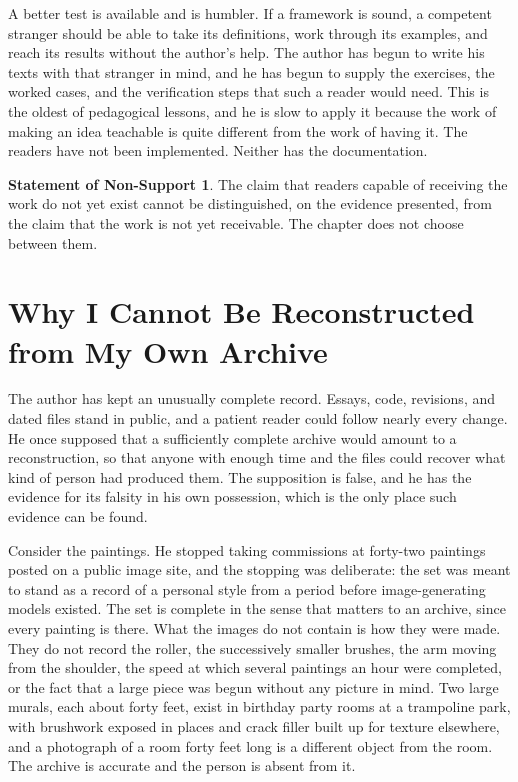 \documentclass[11pt,openany,twoside]{book}
\theoremstyle{plain}
\theoremstyle{definition}
\newtheorem{nonsupport}{Statement of Non-Support}
\theoremstyle{remark}
\begin{document}
A better test is available and is humbler. If a framework is sound, a competent stranger should be able to take its definitions, work through its examples, and reach its results without the author's help. The author has begun to write his texts with that stranger in mind, and he has begun to supply the exercises, the worked cases, and the verification steps that such a reader would need. This is the oldest of pedagogical lessons, and he is slow to apply it because the work of making an idea teachable is quite different from the work of having it. The readers have not been implemented. Neither has the documentation.

\begin{nonsupport}
The claim that readers capable of receiving the work do not yet exist cannot be distinguished, on the evidence presented, from the claim that the work is not yet receivable. The chapter does not choose between them.
\end{nonsupport}

\chapter{Why I Cannot Be Reconstructed from My Own Archive}

The author has kept an unusually complete record. Essays, code, revisions, and dated files stand in public, and a patient reader could follow nearly every change. He once supposed that a sufficiently complete archive would amount to a reconstruction, so that anyone with enough time and the files could recover what kind of person had produced them. The supposition is false, and he has the evidence for its falsity in his own possession, which is the only place such evidence can be found.

Consider the paintings. He stopped taking commissions at forty-two paintings posted on a public image site, and the stopping was deliberate: the set was meant to stand as a record of a personal style from a period before image-generating models existed. The set is complete in the sense that matters to an archive, since every painting is there. What the images do not contain is how they were made. They do not record the roller, the successively smaller brushes, the arm moving from the shoulder, the speed at which several paintings an hour were completed, or the fact that a large piece was begun without any picture in mind. Two large murals, each about forty feet, exist in birthday party rooms at a trampoline park, with brushwork exposed in places and crack filler built up for texture elsewhere, and a photograph of a room forty feet long is a different object from the room. The archive is accurate and the person is absent from it.
\end{document}
